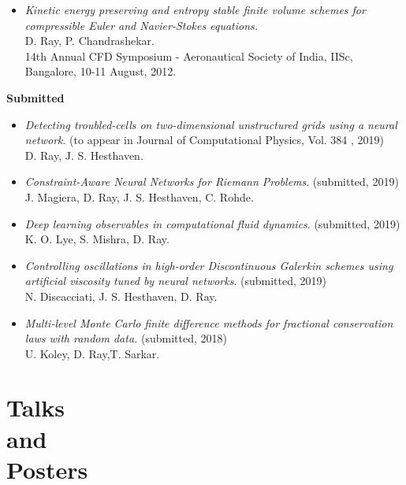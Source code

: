 \documentclass[margin]{res}
\begin{document}
\begin{resume}
\begin{itemize}
              \item {\it Kinetic energy preserving and entropy stable finite volume schemes for compressible Euler and Navier-Stokes equations.}\\
              D. Ray, P. Chandrashekar.\\
              14th Annual CFD Symposium - Aeronautical Society of India, IISc, Bangalore, 10-11 August, 2012.
             \end{itemize}

\textbf{Submitted}                
            \begin{itemize}           
              
               \item {\it Detecting troubled-cells on two-dimensional unstructured grids using a neural network}. (to appear in Journal of Computational Physics, Vol. 384 , 2019) \\
               D. Ray, J. S. Hesthaven.
              
              \item {\it Constraint-Aware Neural Networks for Riemann Problems}. (submitted, 2019) \\
               J. Magiera, D. Ray, J. S. Hesthaven, C. Rohde.
               
               \item {\it Deep learning observables in computational fluid dynamics}. (submitted, 2019) \\
               K. O. Lye, S. Mishra, D. Ray.
               
               \item {\it Controlling oscillations in high-order Discontinuous Galerkin schemes using artificial viscosity tuned by neural networks}. (submitted, 2019) \\
               N. Discacciati, J. S. Hesthaven, D. Ray.
           
              \item {\it Multi-level Monte Carlo finite difference methods for fractional conservation laws with random data.} (submitted, 2018)\\
              U. Koley, D. Ray,T. Sarkar.

             \end{itemize}

             
\section{Talks \\and \\Posters}
  

\end{resume}
\end{document}
